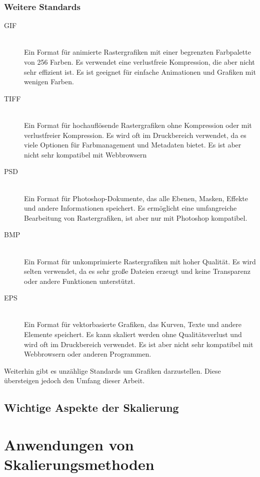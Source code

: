 \subsubsection{Weitere Standards}
\begin{description}
\item[GIF] \\
Ein Format für animierte Rastergrafiken mit einer begrenzten Farbpalette von 256 Farben. Es verwendet eine verlustfreie Kompression, die aber nicht sehr effizient ist. Es ist geeignet für einfache Animationen und Grafiken mit wenigen Farben. \\
\item[TIFF] \\ 
Ein Format für hochauflösende Rastergrafiken ohne Kompression oder mit verlustfreier Kompression. Es wird oft im Druckbereich verwendet, da es viele Optionen für Farbmanagement und Metadaten bietet. Es ist aber nicht sehr kompatibel mit Webbrowsern \\
\item[PSD] \\
Ein Format für Photoshop-Dokumente, das alle Ebenen, Masken, Effekte und andere Informationen speichert. Es ermöglicht eine umfangreiche Bearbeitung von Rastergrafiken, ist aber nur mit Photoshop kompatibel.\\
\item[BMP] \\
Ein Format für unkomprimierte Rastergrafiken mit hoher Qualität. Es wird selten verwendet, da es sehr große Dateien erzeugt und keine Transparenz oder andere Funktionen unterstützt. \\
\item[EPS] \\
Ein Format für vektorbasierte Grafiken, das Kurven, Texte und andere Elemente speichert. Es kann skaliert werden ohne Qualitätsverlust und wird oft im Druckbereich verwendet. Es ist aber nicht sehr kompatibel mit Webbrowsern oder anderen Programmen. \\
\end{description}
Weiterhin gibt es unzählige Standards um Grafiken darzustellen. Diese übersteigen jedoch den Umfang dieser Arbeit.
\subsection{Wichtige Aspekte der Skalierung}


\section{Anwendungen von Skalierungsmethoden}

